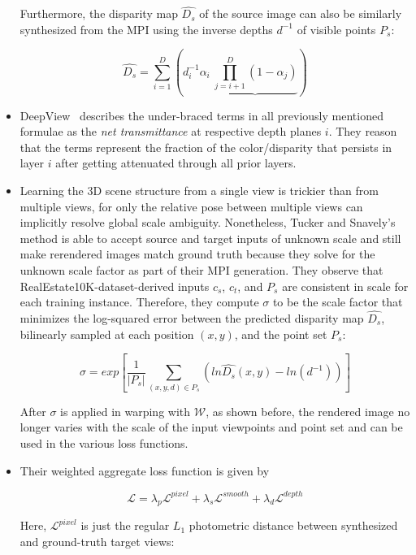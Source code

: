 \begin{itemize}
    Furthermore, the disparity map $\hat{D_s}$ of the source image can also be similarly synthesized from the MPI using the inverse depths $d^{-1}$ of visible points $P_s$:
    
    \begin{equation}\label{eq:disparity-map}
    \hat{D_s} = \sum_{i=1}^D \left(d_i^{-1} \alpha_i\ \underbrace{\prod_{j=i+1}^D (1 - \alpha_j)}\right)
    \end{equation}
    
    \item DeepView~\cite{flynn_deepview_2019} describes the under-braced terms in all previously mentioned formulae as the \textit{net transmittance} at respective depth planes $i$. They reason that the terms represent the fraction of the color/disparity that persists in layer $i$ after getting attenuated through all prior layers.
    \item Learning the 3D scene structure from a single view is trickier than from multiple views, for only the relative pose between multiple views can implicitly resolve global scale ambiguity. Nonetheless, Tucker and Snavely's method is able to accept source and target inputs of unknown scale and still make rerendered images match ground truth because they solve for the unknown scale factor as part of their MPI generation. They observe that RealEstate10K-dataset-derived inputs $c_s$, $c_t$, and $P_s$ are consistent in scale for each training instance. Therefore, they compute $\sigma$ to be the scale factor that minimizes the log-squared error between the predicted disparity map $\hat{D_s}$, bilinearly sampled at each position $(x,y)$, and the point set $P_s$:
    
    \[\sigma = exp \left[\frac{1}{|P_s|} \sum_{(x,y,d) \in P_s} (ln \hat{D_s}(x,y) - ln(d^{-1}))\right]\]
    
    After $\sigma$ is applied in warping with $\mathcal{W}$, as shown before, the rendered image no longer varies with the scale of the input viewpoints and point set and can be used in the various loss functions. 
    \item Their weighted aggregate loss function is given by
    
    \begin{equation}\label{eq:aggregate-loss}
    \mathcal{L} = \lambda_p \mathcal{L}^{pixel} + \lambda_s \mathcal{L}^{smooth} + \lambda_d \mathcal{L}^{depth}
    \end{equation}
    
    Here, $\mathcal{L}^{pixel}$ is just the regular $L_1$ photometric distance between synthesized and ground-truth target views:
    

\end{itemize}
